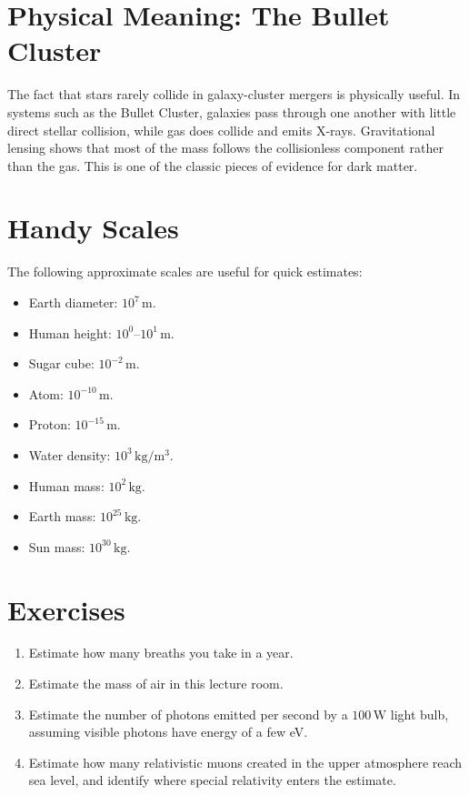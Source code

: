 \documentclass[12pt]{article}
\begin{document}
\section{Physical Meaning: The Bullet Cluster}
The fact that stars rarely collide in galaxy-cluster mergers is physically useful. In systems such as the Bullet Cluster, galaxies pass through one another with little direct stellar collision, while gas does collide and emits X-rays. Gravitational lensing shows that most of the mass follows the collisionless component rather than the gas. This is one of the classic pieces of evidence for dark matter.

\section{Handy Scales}
The following approximate scales are useful for quick estimates:
\begin{itemize}
    \item Earth diameter: $10^7\,\mathrm{m}$.
    \item Human height: $10^0$--$10^1\,\mathrm{m}$.
    \item Sugar cube: $10^{-2}\,\mathrm{m}$.
    \item Atom: $10^{-10}\,\mathrm{m}$.
    \item Proton: $10^{-15}\,\mathrm{m}$.
    \item Water density: $10^3\,\mathrm{kg/m^3}$.
    \item Human mass: $10^2\,\mathrm{kg}$.
    \item Earth mass: $10^{25}\,\mathrm{kg}$.
    \item Sun mass: $10^{30}\,\mathrm{kg}$.
\end{itemize}

\section*{Exercises}
\begin{enumerate}
    \item Estimate how many breaths you take in a year.
    \item Estimate the mass of air in this lecture room.
    \item Estimate the number of photons emitted per second by a $100\,\mathrm{W}$ light bulb, assuming visible photons have energy of a few eV.
    \item Estimate how many relativistic muons created in the upper atmosphere reach sea level, and identify where special relativity enters the estimate.
\end{enumerate}
\end{document}
